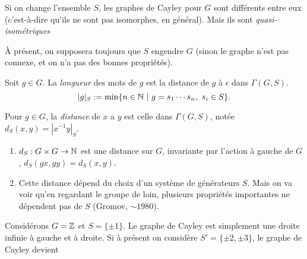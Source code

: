   \begin{rem}
    Si on change l'ensemble $S$, les graphes de Cayley pour $G$ sont différents entre eux (c'est-à-dire qu'ils
    ne sont pas isomorphes, en général). Mais ils sont \emph{quasi-isométriques} 
  \end{rem}


  À présent, on supposera toujours que $S$ engendre $G$ (sinon le graphe n'est pas connexe, et on n'a pas des
  bonnes propriétés).

  \begin{defi} 
    Soit $g \in G$. La \emph{longueur} des mots de $g$ est la distance de $g$ à $\epsilon$ dans $\Gamma(G,S)$.
      \[|g|_S := \min\{n \in \mathbb{N}\ |\ g = s_1\cdots s_n,\ s_i \in S\}.\]

    Pour $g \in G$, la \emph{distance} de $x$ a $y$  est celle dans
    $\Gamma(G,S)$, notée $d_S(x,y) = |x^{-1}y|_S$.
  \end{defi}

  \begin{obss}
    \begin{enumerate}
    \item $d_S: G \times G \to \mathbb{N}$ est une distance sur $G$, invariante par l'action à gauche de $G$, $d_S(gx,
      gy) = d_S(x,y)$.

    \item Cette distance dépend du choix d'un système de générateurs $S$. Mais on va voir qu'en regardant le
      groupe \og de loin\fg, plusieurs propriétés importantes ne dépendent pas de $S$ (Gromov, $\sim 1980$).
    \end{enumerate}
  \end{obss}

  \begin{ex}
    Considérons $G = \mathbb{Z}$ et $S = \{\pm 1\}$. Le graphe de Cayley est simplement une droite infinie à gauche et
    à droite. Si à présent on considère $S' = \{\pm 2, \pm 3\}$, le graphe de Cayley devient 
    \begin{center}
    

          \end{center}
  \end{ex}

 
  

  

  




